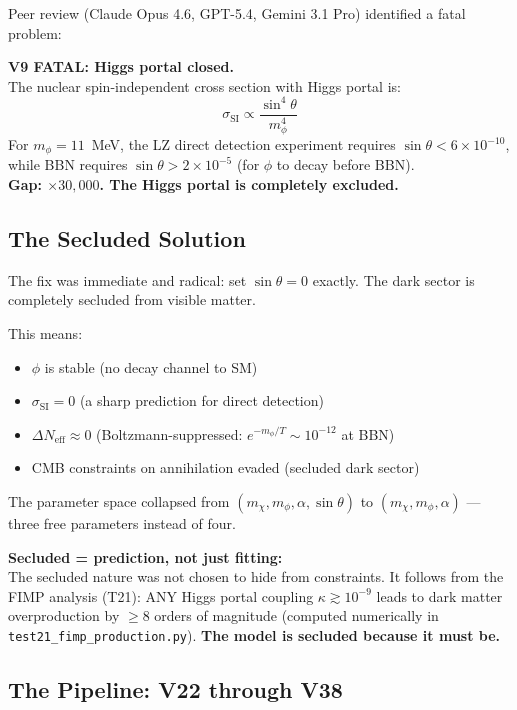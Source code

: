 \documentclass[12pt, a4paper]{article}
\begin{document}
Peer review (Claude Opus 4.6, GPT-5.4, Gemini 3.1 Pro) identified a fatal problem:

\begin{failbox}
\textbf{V9 FATAL: Higgs portal closed.}\\
The nuclear spin-independent cross section with Higgs portal is:
$$\sigma_\text{SI} \propto \frac{\sin^4\theta}{m_\phi^4}$$
For $m_\phi = 11$~MeV, the LZ direct detection experiment requires $\sin\theta < 6 \times 10^{-10}$,
while BBN requires $\sin\theta > 2 \times 10^{-5}$ (for $\phi$ to decay before BBN).\\
\textbf{Gap: $\times 30{,}000$. The Higgs portal is completely excluded.}
\end{failbox}

\subsection{The Secluded Solution}

The fix was immediate and radical: set $\sin\theta = 0$ exactly. The dark sector is completely secluded from visible matter. 

This means:
\begin{itemize}
  \item $\phi$ is stable (no decay channel to SM)
  \item $\sigma_\text{SI} = 0$ (a sharp prediction for direct detection)
  \item $\Delta N_\text{eff} \approx 0$ (Boltzmann-suppressed: $e^{-m_\phi/T} \sim 10^{-12}$ at BBN)
  \item CMB constraints on annihilation evaded (secluded dark sector)
\end{itemize}

The parameter space collapsed from $(m_\chi, m_\phi, \alpha, \sin\theta)$ to $(m_\chi, m_\phi, \alpha)$ --- three free parameters instead of four.

\begin{insightbox}
\textbf{Secluded = prediction, not just fitting:}\\
The secluded nature was not chosen to hide from constraints. It follows from the FIMP analysis (T21):
ANY Higgs portal coupling $\kappa \gtrsim 10^{-9}$ leads to dark matter overproduction by $\geq 8$ orders of magnitude
(computed numerically in \texttt{test21\_fimp\_production.py}).
\textbf{The model is secluded because it must be.}
\end{insightbox}

\subsection{The Pipeline: V22 through V38}
\end{document}
